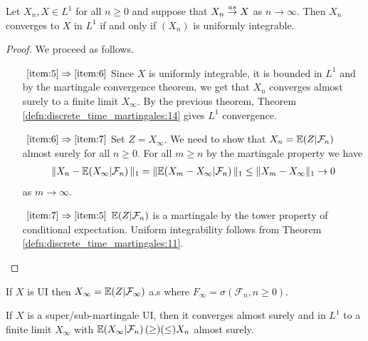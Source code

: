 \begin{thm}
  \label{defn:discrete_time_martingales:14}
  Let $X_{n}, X \in L^{1}$ for all $n \geq 0$ and suppose that $X_{n}
  \overset{as}{\rightarrow} X$ as $n \rightarrow \infty$.  Then $X_{n}$ converges to $X$ in
  $L^{1}$ if and only if $(X_{n})$ is uniformly integrable.
\end{thm}

\begin{proof}
  We proceed as follows.

  \begin{enumerate}
  \item[$~\ref{item:5} \Rightarrow \ref{item:6}$] Since $X$ is
    uniformly integrable, it is bounded in $L^{1}$ and by the
    martingale convergence theorem, we get that $X_{n}$ converges
    almost surely to a finite limit $X_{\infty}$.  By the previous
    theorem, Theorem \ref{defn:discrete_time_martingales:14} gives
    $L^{1}$ convergence.
  \item[$~\ref{item:6} \Rightarrow \ref{item:7}$] Set $Z =
    X_{\infty}$.  We need to show that $X_{n} = \E{Z |
      \mathcal{F}_{n}}$ almost surely for all $n \geq 0$. For all $m
    \geq n$ by the martingale property we have 
    \begin{align}
      \label{eq:43}
      \| X_{n} - \E{X_{\infty} | \mathcal{F}_{n}} \|_{1} = \| \E{X_{m}
      - X_{\infty} | \mathcal{F}_{n}} \|_{1} \leq \| X_{m}- X_{\infty}
    \|_{1} \rightarrow 0
    \end{align} as $m \rightarrow \infty$.
  \item[$~\ref{item:7} \Rightarrow \ref{item:5}$] $\E{Z |
      \mathcal{F}_{n}}$ is a martingale by the tower property of
    conditional expectation.  Uniform integrability follows from
    Theorem \ref{defn:discrete_time_martingales:11}.
  \end{enumerate}
\end{proof}

\begin{remark}
  If $X$ is UI then $X_{\infty} = \E{Z | \mathcal{F}_{\infty}}$ a.s
  where $F_{\infty} = \sigma(\mathcal{F}_{n}, n \geq 0)$.
\end{remark}

\begin{remark}
  If $X$ is a super/sub-martingale UI, then it converges almost surely
  and in $L^{1}$ to a finite limit $X_{\infty}$ with $\E{X_{\infty} |
    \mathcal{F}_{n}} (\geq) (\leq) X_{n}$ almost surely.
\end{remark}

